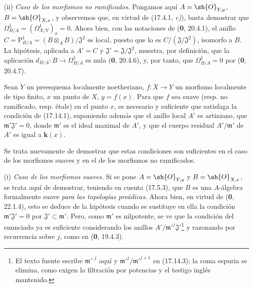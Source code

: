 (ii) \emph{Caso de los morfismos no ramificados.} Pongamos aquí $A=\sh{O}_{Y,y}$, $B=\sh{O}_{X,x}$, y observemos que, en virtud de (17.4.1, \emph{c)}), basta demostrar que $\Omega^1_{B/A}=(\varOmega^1_{X/Y})_x=0$. Ahora bien, con las notaciones de (\textbf 0, 20.4.1), el anillo $C=\mathrm{P}^1_{B/A}=(B\otimes_A B)/\mathfrak{J}^2$ es local, puesto que lo es $C/(\mathfrak{J}/\mathfrak{J}^2)$, isomorfo a $B$. La hipótesis, aplicada a $A'=C$ y $\mathfrak{J}'=\mathfrak{J}/\mathfrak{J}^2$, muestra, por definición, que la aplicación $d_{B/A}:B\to\Omega^1_{B/A}$ es nula (\textbf 0, 20.4.6), y, por tanto, que $\Omega^1_{B/A}=0$ por (\textbf 0, 20.4.7).

\begin{proposition}[17.14.2]
\label{IV.17.14.2}
Sean $Y$ un preesquema \textup{localmente noetheriano}, $f:X\to Y$ un morfismo localmente de tipo finito, $x$ un punto de $X$, $y=f(x)$. Para que $f$ sea suave \textup{(resp.} no ramificado, \textup{resp.} étale\textup{)} en el punto $x$, es necesario y suficiente que satisfaga la condición de \textup{(17.14.1)}, suponiendo además que el anillo local $A'$ es \textup{artiniano}, que $\mathfrak m'\mathfrak{J}'=0$, donde $\mathfrak m'$ es el ideal maximal de $A'$, y que el cuerpo residual $A'/\mathfrak m'$ de $A'$ es \textup{igual a} $\boldsymbol{k}(x)$.
\end{proposition}

Se trata nuevamente de demostrar que estas condiciones son suficientes en el caso de los morfismos suaves y en el de los morfismos no ramificados.


(i) \emph{Caso de los morfismos suaves.} Si se pone $A=\sh{O}_{Y,y}$ y $B=\sh{O}_{X,x}$, se trata aquí de demostrar, teniendo en cuenta (17.5.3), que $B$ es una $A$-álgebra formalmente suave \emph{para las topologías preádicas}. Ahora bien, en virtud de (\textbf 0, 22.1.4), esto se deduce de la hipótesis cuando se sustituye en ella la condición $\mathfrak m'\mathfrak{J}'=0$ por $\mathfrak{J}'\subset\mathfrak m'$. Pero, como $\mathfrak m'$ es nilpotente, se ve que la condición del enunciado ya es suficiente considerando los anillos $A'/\mathfrak m'^{j}\mathfrak{J}'$\footnote{El texto fuente escribe $\mathfrak m'^{,j}$ aquí y $\mathfrak m'^{j}/\mathfrak m'^{j+1}$ en (17.14.3); la coma espuria se elimina, como exigen la filtración por potencias y el testigo inglés mantenido.} y razonando por recurrencia sobre $j$, como en (\textbf 0, 19.4.3).

